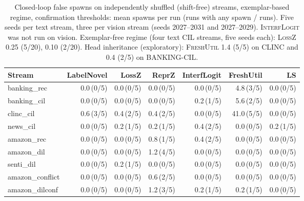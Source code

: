 \begin{table}[h]\centering\small
\caption{Closed-loop false spawns on independently shuffled (shift-free) streams, exemplar-based regime, confirmation thresholds: mean spawns per run (runs with any spawn / runs). Five seeds per text stream, three per vision stream (seeds 2027--2031 and 2027--2029). \textsc{InterfLogit} was not run on vision. Exemplar-free regime (four text CIL streams, five seeds each): \textsc{LossZ} 0.25 (5/20), \ls{} 0.10 (2/20). Head inheritance (exploratory): \textsc{FreshUtil} 1.4 (5/5) on CLINC and 0.4 (2/5) on BANKING-CIL.}\label{tab:falsespawn}
\begin{tabular}{lrrrrrr}\toprule
Stream & LabelNovel & LossZ & ReprZ & InterfLogit & FreshUtil & \textsc{LS}\\\midrule
banking\_rec & 0.0\,{\scriptsize(0/5)} & 0.0\,{\scriptsize(0/5)} & 0.0\,{\scriptsize(0/5)} & 0.0\,{\scriptsize(0/5)} & 4.8\,{\scriptsize(3/5)} & 0.0\,{\scriptsize(0/5)}\\
banking\_cil & 0.0\,{\scriptsize(0/5)} & 0.0\,{\scriptsize(0/5)} & 0.0\,{\scriptsize(0/5)} & 0.2\,{\scriptsize(1/5)} & 5.6\,{\scriptsize(2/5)} & 0.0\,{\scriptsize(0/5)}\\
clinc\_cil & 0.6\,{\scriptsize(3/5)} & 0.4\,{\scriptsize(2/5)} & 0.4\,{\scriptsize(2/5)} & 0.0\,{\scriptsize(0/5)} & 41.0\,{\scriptsize(5/5)} & 0.0\,{\scriptsize(0/5)}\\
news\_cil & 0.0\,{\scriptsize(0/5)} & 0.2\,{\scriptsize(1/5)} & 0.2\,{\scriptsize(1/5)} & 0.4\,{\scriptsize(2/5)} & 0.0\,{\scriptsize(0/5)} & 0.2\,{\scriptsize(1/5)}\\
amazon\_rec & 0.0\,{\scriptsize(0/5)} & 0.0\,{\scriptsize(0/5)} & 0.8\,{\scriptsize(1/5)} & 0.4\,{\scriptsize(2/5)} & 0.0\,{\scriptsize(0/5)} & 0.0\,{\scriptsize(0/5)}\\
amazon\_dil & 0.0\,{\scriptsize(0/5)} & 0.0\,{\scriptsize(0/5)} & 1.2\,{\scriptsize(4/5)} & 0.0\,{\scriptsize(0/5)} & 0.0\,{\scriptsize(0/5)} & 0.0\,{\scriptsize(0/5)}\\
senti\_dil & 0.0\,{\scriptsize(0/5)} & 0.2\,{\scriptsize(1/5)} & 0.0\,{\scriptsize(0/5)} & 0.0\,{\scriptsize(0/5)} & 0.0\,{\scriptsize(0/5)} & 0.0\,{\scriptsize(0/5)}\\
amazon\_conflict & 0.0\,{\scriptsize(0/5)} & 0.0\,{\scriptsize(0/5)} & 0.6\,{\scriptsize(2/5)} & 0.0\,{\scriptsize(0/5)} & 0.0\,{\scriptsize(0/5)} & 0.0\,{\scriptsize(0/5)}\\
amazon\_dilconf & 0.0\,{\scriptsize(0/5)} & 0.0\,{\scriptsize(0/5)} & 1.2\,{\scriptsize(3/5)} & 0.2\,{\scriptsize(1/5)} & 0.2\,{\scriptsize(1/5)} & 0.0\,{\scriptsize(0/5)}\\

\end{tabular}
\end{table}

